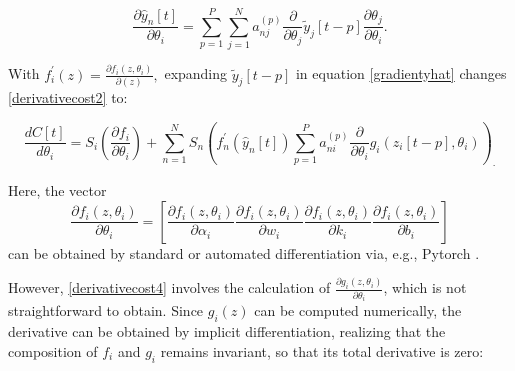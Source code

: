 \begin{equation} \label{gradientyhat}
    \frac{\partial \hat{y}_{n}[t]}{\partial \theta_i}
    =
    \sum_{p=1}^{P}\sum_{j=1}^{N}  
        a_{n j}^{(p)} 
        \frac{\partial}{\partial \theta_{j}} \tilde{y}_{j}[t-p]
        \frac{\partial \theta_{j}}{\partial \theta_{i}} .
\end{equation}

With $f_{i}^{\prime}\left(z\right)= 
\frac{\partial f_i\left(z, \theta_{i}\right)}{\partial\left(z\right)}, $  
expanding $\tilde{y}_j[t-p]$ in equation \eqref{gradientyhat} changes \eqref{derivativecost2} to:



\begin{equation} \label{derivativecost4}
 \frac{d C[t]}{d \theta_{i}}=S_{i}\left(\frac{\partial f_{i}}{\partial \theta_{i}}\right)+\sum_{n=1}^{N} S_{n}\left(f_{n}^{\prime}(\hat{y}_{n}[t]) \sum_{p=1}^{P} a_{n i}^{(p)} \frac{\partial}{\partial \theta_{i}} g_{i}\left(z_{i}[t-p],\theta_{i}\right)\right)_\cdot
\end{equation}

Here, the vector 
$$\frac{\partial f_i\left(z, \theta_{i}\right)}{\partial \theta_{i}} %
= \left[
\frac{\partial f_i\left(z, \theta_{i}\right)}{\partial \alpha_{i}} 
\frac{\partial f_i\left(z, \theta_{i}\right)}{\partial w_{i}} 
\frac{\partial f_i\left(z, \theta_{i}\right)}{\partial k_{i}} 
\frac{\partial f_i\left(z, \theta_{i}\right)}{\partial b_{i}} \right]$$ can be obtained by standard or automated differentiation via, e.g., Pytorch \cite{NEURIPS2019_9015}.


However, \eqref{derivativecost4} involves the calculation of $\frac{\partial g_i(z, \theta_{i})}{\partial \theta_{i}}$, which is not straightforward to obtain. Since $g_i(z)$ can be computed numerically, the derivative can be obtained by implicit differentiation, realizing that the composition of $f_i$ and $g_i$ remains invariant, so that its total derivative is zero:


